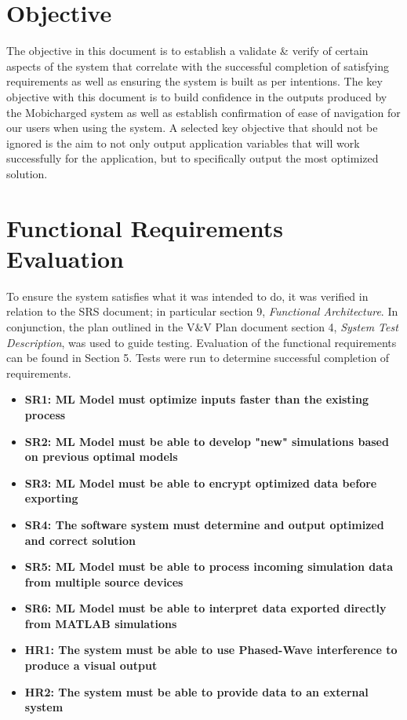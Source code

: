 \documentclass[12pt, titlepage]{article}
\begin{document}
\section{Objective}
The objective in this document is to establish a validate \& verify of certain aspects of the system that correlate with the successful completion of satisfying requirements as well as ensuring the system is built as per intentions. The key objective with this document is to build confidence in the outputs produced by the Mobicharged system as well as establish confirmation of ease of navigation for our users when using the system. A selected key objective that should not be ignored is the aim to not only output application variables that will work successfully for the application, but to specifically output the most optimized solution.

\section{Functional Requirements Evaluation}
To ensure the system satisfies what it was intended to do, it was verified in relation to the SRS document; in particular section 9, \emph{Functional Architecture}. In conjunction, the plan outlined in the V\&V Plan document section 4, \emph{System Test Description}, was used to guide testing. Evaluation of the functional requirements can be found in Section 5. Tests were run to determine successful completion of requirements. 

\begin{center}
    \begin{itemize}
        \item \textbf{SR1: ML Model must optimize inputs faster than the existing process}
        \item \textbf{SR2: ML Model must be able to develop "new" simulations based on previous optimal models}
        \item \textbf{SR3: ML Model must be able to encrypt optimized data before exporting}
        \item \textbf{SR4: The software system must determine and output optimized and correct solution}
        \item \textbf{SR5: ML Model must be able to process incoming simulation data from multiple source devices}
        \item \textbf{SR6: ML Model must be able to interpret data exported directly from MATLAB simulations}
        \item \textbf{HR1: The system must be able to use Phased-Wave interference to produce a visual output}
        \item \textbf{HR2: The system must be able to provide data to an external system}
    \end{itemize}
\end{center}
\end{document}

